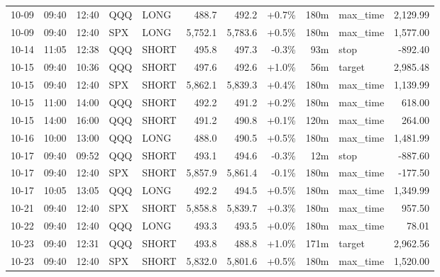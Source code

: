 \documentclass[11pt,a4paper,twoside]{article}
\begin{document}
\begin{center}
\begin{longtable}{>{\color{txtmain}}l l l l l r r r r >{\color{txtmain}}l r}
10-09 & 09:40 & 12:40 & QQQ & LONG & 488.7 & 492.2 & \textcolor{wingreen}{+0.7\%} & 180m & max\_time & \textcolor{wingreen}{2,129.99} \\
10-09 & 09:40 & 12:40 & SPX & LONG & 5,752.1 & 5,783.6 & \textcolor{wingreen}{+0.5\%} & 180m & max\_time & \textcolor{wingreen}{1,577.00} \\
10-14 & 11:05 & 12:38 & QQQ & SHORT & 495.8 & 497.3 & \textcolor{lossred}{-0.3\%} & 93m & stop & \textcolor{lossred}{-892.40} \\
10-15 & 09:40 & 10:36 & QQQ & SHORT & 497.6 & 492.6 & \textcolor{wingreen}{+1.0\%} & 56m & target & \textcolor{wingreen}{2,985.48} \\
10-15 & 09:40 & 12:40 & SPX & SHORT & 5,862.1 & 5,839.3 & \textcolor{wingreen}{+0.4\%} & 180m & max\_time & \textcolor{wingreen}{1,139.99} \\
10-15 & 11:00 & 14:00 & QQQ & SHORT & 492.2 & 491.2 & \textcolor{wingreen}{+0.2\%} & 180m & max\_time & \textcolor{wingreen}{618.00} \\
10-15 & 14:00 & 16:00 & QQQ & SHORT & 491.2 & 490.8 & \textcolor{wingreen}{+0.1\%} & 120m & max\_time & \textcolor{wingreen}{264.00} \\
10-16 & 10:00 & 13:00 & QQQ & LONG & 488.0 & 490.5 & \textcolor{wingreen}{+0.5\%} & 180m & max\_time & \textcolor{wingreen}{1,481.99} \\
10-17 & 09:40 & 09:52 & QQQ & SHORT & 493.1 & 494.6 & \textcolor{lossred}{-0.3\%} & 12m & stop & \textcolor{lossred}{-887.60} \\
10-17 & 09:40 & 12:40 & SPX & SHORT & 5,857.9 & 5,861.4 & \textcolor{lossred}{-0.1\%} & 180m & max\_time & \textcolor{lossred}{-177.50} \\
10-17 & 10:05 & 13:05 & QQQ & LONG & 492.2 & 494.5 & \textcolor{wingreen}{+0.5\%} & 180m & max\_time & \textcolor{wingreen}{1,349.99} \\
10-21 & 09:40 & 12:40 & SPX & SHORT & 5,858.8 & 5,839.7 & \textcolor{wingreen}{+0.3\%} & 180m & max\_time & \textcolor{wingreen}{957.50} \\
10-22 & 09:40 & 12:40 & QQQ & LONG & 493.3 & 493.5 & \textcolor{wingreen}{+0.0\%} & 180m & max\_time & \textcolor{wingreen}{78.01} \\
10-23 & 09:40 & 12:31 & QQQ & SHORT & 493.8 & 488.8 & \textcolor{wingreen}{+1.0\%} & 171m & target & \textcolor{wingreen}{2,962.56} \\
10-23 & 09:40 & 12:40 & SPX & SHORT & 5,832.0 & 5,801.6 & \textcolor{wingreen}{+0.5\%} & 180m & max\_time & \textcolor{wingreen}{1,520.00} \\

\end{longtable}
\end{center}
\end{document}
